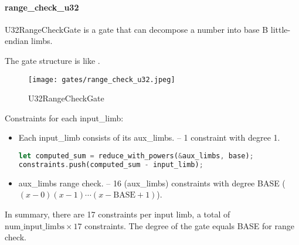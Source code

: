 \paragraph{range\_check\_u32}

U32RangeCheckGate is a gate that can decompose a number into base B little-endian limbs.

The gate structure is like .

\begin{figure}[!ht]
    \centering
    \texttt{[image: gates/range\_check\_u32.jpeg]}
    \caption{U32RangeCheckGate}
    \label{fig:range-check-u32}
\end{figure}

Constraints for each input\_limb:
\begin{itemize}
    \item Each input\_limb consists of its aux\_limbs. -- 1 constraint with degree 1.
    \begin{lstlisting}[language=rust]
let computed_sum = reduce_with_powers(&aux_limbs, base);
constraints.push(computed_sum - input_limb);
    \end{lstlisting}
    \item aux\_limbs range check. -- 16 (aux\_limbs) constraints with degree BASE ($(x-0)(x-1)\cdots(x-\text{BASE}+1)$).
\end{itemize}

In summary, there are 17 constraints per input limb, a total of $\text{num\_input\_limbs} \times 17$ constraints. 
The degree of the gate equals BASE for range check.
